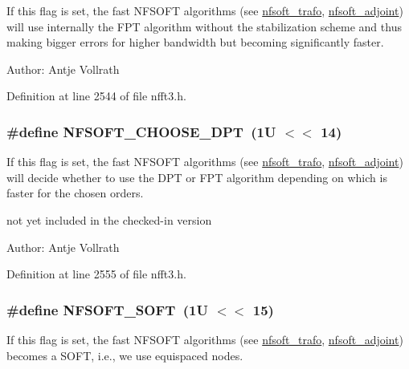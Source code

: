 If this flag is set, the fast NFSOFT algorithms (see \hyperlink{group__nfsoft_ge243cd75d7571a99eae53818e32355fb}{nfsoft\_\-trafo}, \hyperlink{group__nfsoft_g08395b1dd90f9a2565685d17460afc5b}{nfsoft\_\-adjoint}) will use internally the FPT algorithm without the stabilization scheme and thus making bigger errors for higher bandwidth but becoming significantly faster. 

\begin{Desc}
\item[Author:]Antje Vollrath \end{Desc}


Definition at line 2544 of file nfft3.h.\hypertarget{group__nfsoft_g43ce16ed2d1893df2b997e637ccde4d4}{
\subsubsection{\setlength{\rightskip}{0pt plus 5cm}\#define NFSOFT\_\-CHOOSE\_\-DPT~(1U $<$$<$ 14)}}
\label{group__nfsoft_g43ce16ed2d1893df2b997e637ccde4d4}


If this flag is set, the fast NFSOFT algorithms (see \hyperlink{group__nfsoft_ge243cd75d7571a99eae53818e32355fb}{nfsoft\_\-trafo}, \hyperlink{group__nfsoft_g08395b1dd90f9a2565685d17460afc5b}{nfsoft\_\-adjoint}) will decide whether to use the DPT or FPT algorithm depending on which is faster for the chosen orders. 

not yet included in the checked-in version

\begin{Desc}
\item[Author:]Antje Vollrath \end{Desc}


Definition at line 2555 of file nfft3.h.\hypertarget{group__nfsoft_g07ad8a429e8451bd153563eedc3ef0bf}{
\subsubsection{\setlength{\rightskip}{0pt plus 5cm}\#define NFSOFT\_\-SOFT~(1U $<$$<$ 15)}}
\label{group__nfsoft_g07ad8a429e8451bd153563eedc3ef0bf}


If this flag is set, the fast NFSOFT algorithms (see \hyperlink{group__nfsoft_ge243cd75d7571a99eae53818e32355fb}{nfsoft\_\-trafo}, \hyperlink{group__nfsoft_g08395b1dd90f9a2565685d17460afc5b}{nfsoft\_\-adjoint}) becomes a SOFT, i.e., we use equispaced nodes. 

